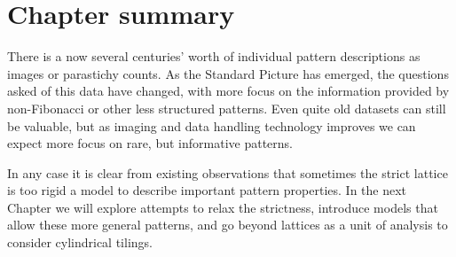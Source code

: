  
  
  \section{Chapter summary}
  There is a now several centuries' worth of individual pattern descriptions as images or parastichy counts. As the Standard Picture has emerged, the questions asked of this data have changed, with more focus on the information provided by non-Fibonacci or other less structured patterns. Even quite old datasets can still be valuable, but as imaging and data handling technology improves we can expect more focus on rare, but informative patterns. 
  
  In any case it is clear from existing observations that sometimes the strict lattice is too rigid a model to describe important pattern properties. In the next Chapter we will explore attempts to relax the strictness, introduce models that allow these more general patterns, and 
  go beyond lattices as a unit of analysis to consider cylindrical tilings. 

